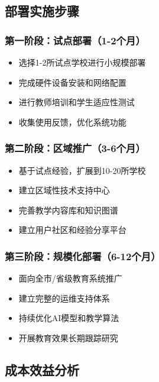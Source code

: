 \documentclass[12pt,a4paper]{article}
\begin{document}
\subsection{部署实施步骤}

\subsubsection{第一阶段：试点部署（1-2个月）}
\begin{itemize}[leftmargin=2em]
    \item 选择1-2所试点学校进行小规模部署
    \item 完成硬件设备安装和网络配置
    \item 进行教师培训和学生适应性测试
    \item 收集使用反馈，优化系统功能
\end{itemize}

\subsubsection{第二阶段：区域推广（3-6个月）}
\begin{itemize}[leftmargin=2em]
    \item 基于试点经验，扩展到10-20所学校
    \item 建立区域性技术支持中心
    \item 完善教学内容库和知识图谱
    \item 建立用户社区和经验分享平台
\end{itemize}

\subsubsection{第三阶段：规模化部署（6-12个月）}
\begin{itemize}[leftmargin=2em]
    \item 面向全市/省级教育系统推广
    \item 建立完整的运维支持体系
    \item 持续优化AI模型和教学算法
    \item 开展教育效果长期跟踪研究
\end{itemize}

\subsection{成本效益分析}
\end{document}
